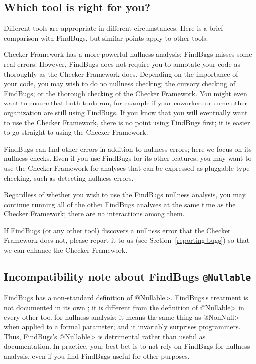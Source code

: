 \subsection{Which tool is right for you?\label{choosing-nullness-tool}}

Different tools are appropriate in different circumstances.  Here is a
brief comparison with FindBugs, but similar points apply to other tools.

Checker Framework has a more powerful nullness analysis; FindBugs misses
some real
errors.  However, FindBugs does not require you to annotate your code as
thoroughly as the Checker Framework does.  Depending on the importance of
your code, you may wish to do no nullness checking; the cursory checking of
FindBugs; or the thorough checking of the Checker Framework.  You might
even want to ensure that both tools run, for example if your coworkers or
some other organization are still using FindBugs.  If you know that you
will eventually want to use the Checker Framework, there is no point using
FindBugs first; it is easier to go straight to using the Checker Framework.

FindBugs can find other errors in addition to nullness errors; here
we focus on its nullness checks.  Even if you use FindBugs for its other
features, you may want to use the Checker Framework for analyses that can
be expressed as pluggable type-checking, such as detecting nullness errors.

Regardless of whether you wish to use the FindBugs nullness analysis, you
may continue running all of the other FindBugs analyses at the same time as
the Checker Framework; there are no interactions among them.

If FindBugs (or any other tool) discovers a nullness error that the Checker
Framework does not, please report it to us (see
Section~\ref{reporting-bugs}) so that we can enhance the Checker Framework.



\subsection{Incompatibility note about FindBugs \tt{@Nullable}\label{findbugs-nullable}}

FindBugs has a non-standard definition of \<@Nullable>.  FindBugs's treatment is not
documented in its own
;
it is different from the definition of \<@Nullable> in every other tool for
nullness analysis; it means the same thing as \<@NonNull> when applied to a
formal parameter; and it invariably surprises programmers.  Thus, FindBugs's
\<@Nullable> is detrimental rather than useful as documentation.
In practice, your best bet is to not rely on FindBugs for nullness analysis,
even if you find FindBugs useful for other purposes.

